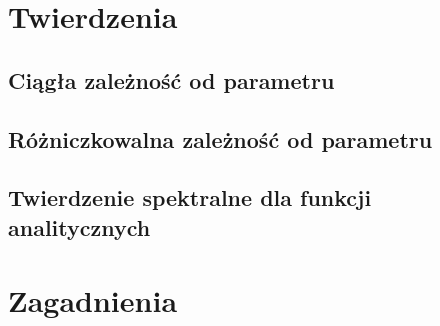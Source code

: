 



  \maketitle
  
  \tableofcontents
  
  \chapter{Twierdzenia}
    \section{Ciągła zależność od parametru}
      
    \section{Różniczkowalna zależność od parametru}
      
    \section{Twierdzenie spektralne dla funkcji analitycznych}
      
  
  \chapter{Zagadnienia}
